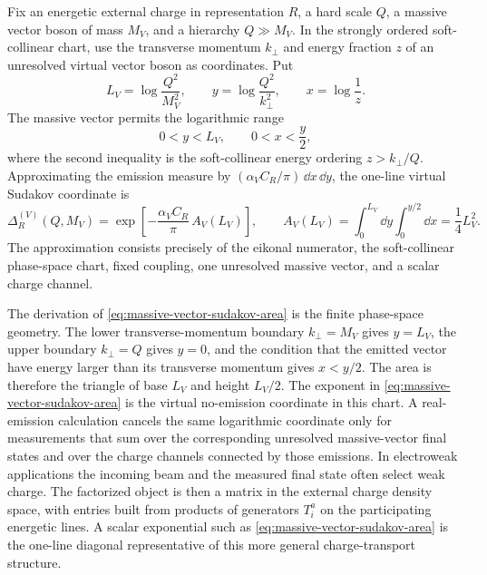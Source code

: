 \begin{controlledapproximation}
\label{ca:massive-vector-sudakov-chart}
Fix an energetic external charge in representation \(R\), a hard scale
\(Q\), a massive vector boson of mass \(M_V\), and a hierarchy
\(Q\gg M_V\).  In the strongly ordered soft-collinear chart, use the transverse
momentum \(k_\perp\) and energy fraction \(z\) of an unresolved virtual vector
boson as coordinates.  Put
\[
  L_V=\log\frac{Q^2}{M_V^2},\qquad
  y=\log\frac{Q^2}{k_\perp^2},\qquad
  x=\log\frac1z .
\]
The massive vector permits the logarithmic range
\begin{equation}
  0<y<L_V,\qquad 0<x<\frac{y}{2},
  \label{eq:massive-vector-sudakov-region}
\end{equation}
where the second inequality is the soft-collinear energy ordering
\(z>k_\perp/Q\).  Approximating the emission measure by
\((\alpha_V C_R/\pi)\,\dd x\,\dd y\), the one-line virtual Sudakov coordinate
is
\begin{equation}
  \Delta_R^{(V)}(Q,M_V)
  =
  \exp\!\left[
    -\frac{\alpha_V C_R}{\pi}\,
    A_V(L_V)
  \right],
  \qquad
  A_V(L_V)
  =
  \int_0^{L_V}\dd y\int_0^{y/2}\dd x
  =
  \frac14L_V^2 .
  \label{eq:massive-vector-sudakov-area}
\end{equation}
The approximation consists precisely of the eikonal numerator, the
soft-collinear phase-space chart, fixed coupling, one unresolved massive
vector, and a scalar charge channel.
\end{controlledapproximation}

The derivation of \eqref{eq:massive-vector-sudakov-area} is the finite
phase-space geometry.  The lower transverse-momentum boundary
\(k_\perp=M_V\) gives \(y=L_V\), the upper boundary \(k_\perp=Q\) gives
\(y=0\), and the condition that the emitted vector have energy larger than
its transverse momentum gives \(x<y/2\).  The area is therefore the triangle
of base \(L_V\) and height \(L_V/2\).  The exponent in
\eqref{eq:massive-vector-sudakov-area} is the virtual no-emission coordinate
in this chart.  A real-emission calculation cancels the same logarithmic
coordinate only for measurements that sum over the corresponding unresolved
massive-vector final states and over the charge channels connected by those
emissions.  In electroweak applications the incoming beam and the measured
final state often select weak charge.  The factorized object is then a matrix
in the external charge density space, with entries built from products of
generators \(T_i^a\) on the participating energetic lines.  A scalar
exponential such as \eqref{eq:massive-vector-sudakov-area} is the
one-line diagonal representative of this more general charge-transport
structure.

